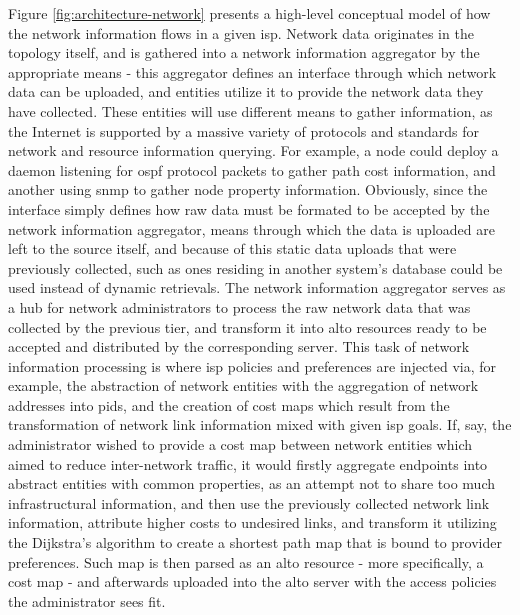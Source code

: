     Figure \ref{fig:architecture-network} presents a high-level conceptual model of how the network information flows in a given \gls{isp}.
    Network data originates in the topology itself, and is gathered into a network information aggregator by the appropriate means - this aggregator defines an interface through which network data can be uploaded, and entities utilize it to provide the network data they have collected.
    These entities will use different means to gather information, as the Internet is supported by a massive variety of protocols and standards for network and resource information querying.
    For example, a node could deploy a daemon listening for \gls{ospf} protocol packets to gather path cost information, and another using \gls{snmp} to gather node property information.
    Obviously, since the interface simply defines how raw data must be formated to be accepted by the network information aggregator, means through which the data is uploaded are left to the source itself, and because of this static data uploads that were previously collected, such as ones residing in another system's database could be used instead of dynamic retrievals.
    The network information aggregator serves as a hub for network administrators to process the raw network data that was collected by the previous tier, and transform it into \gls{alto} resources ready to be accepted and distributed by the corresponding server.
    This task of network information processing is where \gls{isp} policies and preferences are injected via, for example, the abstraction of network entities with the aggregation of network addresses into \glspl{pid}, and the creation of cost maps which result from the transformation of network link information mixed with given \gls{isp} goals.
    If, say, the administrator wished to provide a cost map between network entities which aimed to reduce inter-network traffic, it would firstly aggregate endpoints into abstract entities with common properties, as an attempt not to share too much infrastructural information, and then use the previously collected network link information, attribute higher costs to undesired links, and transform it utilizing the Dijkstra's algorithm to create a shortest path map that is bound to provider preferences.
    Such map is then parsed as an \gls{alto} resource - more specifically, a cost map - and afterwards uploaded into the \gls{alto} server with the access policies the administrator sees fit.

